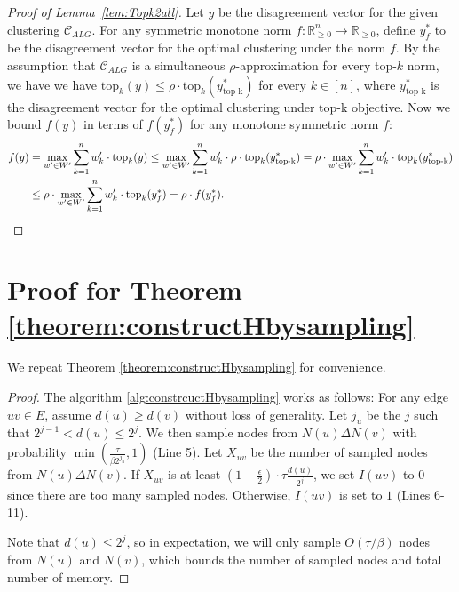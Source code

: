 \documentclass[11pt]{article}
\newcommand{\R}{\mathbb{R}}
\newcommand{\calC}{{\mathcal{C}}}
\newcommand{\topk}{\mathrm{top}_k}
\begin{document}
\begin{CJK*}{UTF8}{gbsn}
\begin{proof}[Proof of Lemma~\ref{lem:Topk2all}]
    Let $y$ be the disagreement vector for the given clustering $\calC_{ALG}$. For any symmetric monotone norm $f: \R_{\geq 0}^n \to \R_{\geq 0}$, define $y^*_f$ to be the disagreement vector for the optimal clustering under the norm $f$. By the assumption that $\calC_{ALG}$ is a simultaneous $\rho$-approximation for every top-$k$ norm, we have we have $\topk(y)\le \rho \cdot \topk(y^*_{\text{top-k}})$ for every $k \in [n]$, where $y^*_{\text{top-k}}$ is the disagreement vector for the optimal clustering under top-k objective. Now we bound $f(y)$ in terms of $f(y^*_f)$ for any monotone symmetric norm $f$:
    \begin{align*}
        f(y)&=\max_{w'\in W'}\sum_{k=1}^n w_k'\cdot \topk(y)
        \le \max_{w'\in W'}\sum_{k=1}^n w_k'\cdot \rho \cdot \topk(y^*_{\text{top-k}})
        = \rho \cdot \max_{w'\in W'}\sum_{k=1}^n w_k'\cdot \topk(y^*_{\text{top-k}})\\
        &\le \rho \cdot \max_{w'\in W'}\sum_{k=1}^n w_k'\cdot \topk(y^*_f)
        = \rho \cdot f(y^*_f). \qedhere
    \end{align*}
\end{proof}
%
 
\section{Proof for Theorem \ref{theorem:constructHbysampling}}
\label{sec:constructH}
We repeat Theorem \ref{theorem:constructHbysampling} for convenience. 
\thmcnostructH*


\begin{proof}

The algorithm \ref{alg:constrcuctHbysampling} works as follows: For any edge $uv \in E$, assume $d(u) \geq d(v)$ without loss of generality. Let $j_u$ be the $j$ such that $2^{j-1} < d(u) \leq 2^j$. We then sample nodes from $N(u) \Delta N(v)$ with probability $\min(\frac{\tau}{\beta 2^{j_u}}, 1)$ (Line 5). Let $X_{uv}$ be the number of sampled nodes from $N(u) \Delta N(v)$. If $X_{uv}$ is at least $(1 + \frac{\epsilon}{2}) \cdot \tau \frac{d(u)}{2^j}$, we set $I(uv)$ to $0$ since there are too many sampled nodes. Otherwise, $I(uv)$ is set to $1$ (Lines 6-11).

Note that $d(u) \leq 2^j$, so in expectation, we will only sample $O(\tau / \beta)$ nodes from $N(u)$ and $N(v)$, which bounds the number of sampled nodes and total number of memory.


\end{proof}
\end{CJK*}
\end{document}
